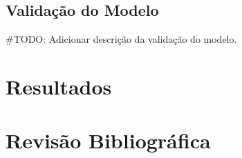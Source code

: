 \documentclass[conference]{IEEEtran}
\begin{document}


\subsection{Validação do Modelo}
#TODO: Adicionar descrição da validação do modelo.


\section{Resultados}



\section{Revisão Bibliográfica}
\end{document}
